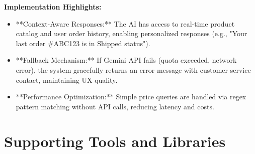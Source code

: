 \documentclass[12pt, a4paper]{report}
\begin{document}
\textbf{Implementation Highlights:}
\begin{itemize}
    \item **Context-Aware Responses:** The AI has access to real-time product catalog and user order history, enabling personalized responses (e.g., "Your last order \#ABC123 is in Shipped status").
    \item **Fallback Mechanism:** If Gemini API fails (quota exceeded, network error), the system gracefully returns an error message with customer service contact, maintaining UX quality.
    \item **Performance Optimization:** Simple price queries are handled via regex pattern matching without API calls, reducing latency and costs.
\end{itemize}

\section{Supporting Tools and Libraries}
\end{document}
